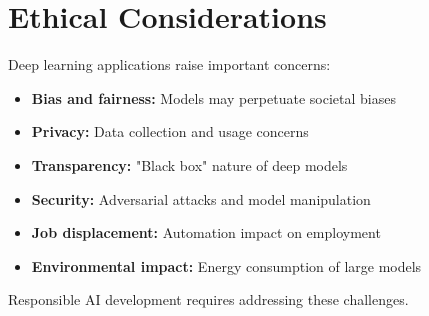 
\section{Ethical Considerations}
\label{sec:ethics}

Deep learning applications raise important concerns:

\begin{itemize}
    \item \textbf{Bias and fairness:} Models may perpetuate societal biases
    \item \textbf{Privacy:} Data collection and usage concerns
    \item \textbf{Transparency:} "Black box" nature of deep models
    \item \textbf{Security:} Adversarial attacks and model manipulation
    \item \textbf{Job displacement:} Automation impact on employment
    \item \textbf{Environmental impact:} Energy consumption of large models
\end{itemize}

Responsible AI development requires addressing these challenges.
